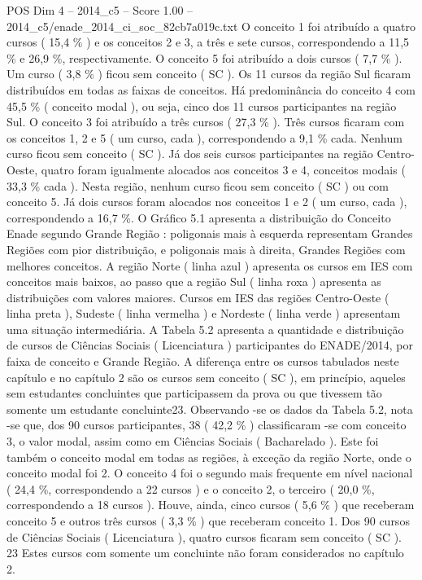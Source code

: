 \begin{textsample}{POS Dim 4 – 2014\_c5 – Score 1.00 – 2014\_c5/enade\_2014\_ci\_soc\_82cb7a019c.txt}
O conceito 1 foi atribuído a quatro cursos ( 15,4 \% ) e os conceitos 2 e 3, a três e sete cursos, correspondendo a 11,5 \% e 26,9 \%, respectivamente.
O conceito 5 foi atribuído a dois cursos ( 7,7 \% ).
Um curso ( 3,8 \% ) ficou sem conceito ( SC ).
Os 11 cursos da região Sul ficaram distribuídos em todas as faixas de conceitos.
Há predominância do conceito 4 com 45,5 \% ( conceito modal ), ou seja, cinco dos 11 cursos participantes na região Sul.
O conceito 3 foi atribuído a três cursos ( 27,3 \% ).
Três cursos ficaram com os conceitos 1, 2 e 5 ( um curso, cada ), correspondendo a 9,1 \% cada.
Nenhum curso ficou sem conceito ( SC ).
Já dos seis cursos participantes na região Centro-Oeste, quatro foram igualmente alocados aos conceitos 3 e 4, conceitos modais ( 33,3 \% cada ).
Nesta região, nenhum curso ficou sem conceito ( SC ) ou com conceito 5.
Já dois cursos foram alocados nos conceitos 1 e 2 ( um curso, cada ), correspondendo a 16,7 \%.
O Gráfico 5.1 apresenta a distribuição do Conceito Enade segundo Grande Região : poligonais mais à esquerda representam Grandes Regiões com pior distribuição, e poligonais mais à direita, Grandes Regiões com melhores conceitos.
A região Norte ( linha azul ) apresenta os cursos em IES com conceitos mais baixos, ao passo que a região Sul ( linha roxa ) apresenta as distribuições com valores maiores.
Cursos em IES das regiões Centro-Oeste ( linha preta ), Sudeste ( linha vermelha ) e Nordeste ( linha verde ) apresentam uma situação intermediária.
A Tabela 5.2 apresenta a quantidade e distribuição de cursos de Ciências Sociais ( Licenciatura ) participantes do ENADE/2014, por faixa de conceito e Grande Região.
A diferença entre os cursos tabulados neste capítulo e no capítulo 2 são os cursos sem conceito ( SC ), em princípio, aqueles sem estudantes concluintes que participassem da prova ou que tivessem tão somente um estudante concluinte23.
Observando -se os dados da Tabela 5.2, nota -se que, dos 90 cursos participantes, 38 ( 42,2 \% ) classificaram -se com conceito 3, o valor modal, assim como em Ciências Sociais ( Bacharelado ).
Este foi também o conceito modal em todas as regiões, à exceção da região Norte, onde o conceito modal foi 2.
O conceito 4 foi o segundo mais frequente em nível nacional ( 24,4 \%, correspondendo a 22 cursos ) e o conceito 2, o terceiro ( 20,0 \%, correspondendo a 18 cursos ).
Houve, ainda, cinco cursos ( 5,6 \% ) que receberam conceito 5 e outros três cursos ( 3,3 \% ) que receberam conceito 1.
Dos 90 cursos de Ciências Sociais ( Licenciatura ), quatro cursos ficaram sem conceito ( SC ). 23 Estes cursos com somente um concluinte não foram considerados no capítulo 2.

\end{textsample}
